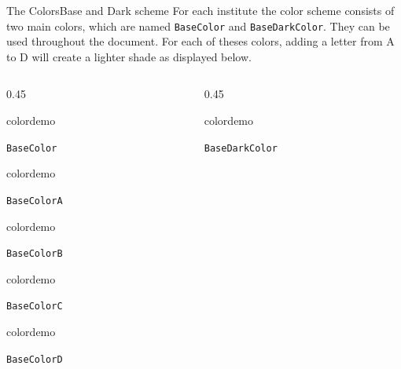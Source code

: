 \documentclass[final]{beamer}
\begin{document}
\begin{frame}{The Colors}{Base and Dark scheme}
For each institute the color scheme consists of two main colors, which are named 
\texttt{BaseColor} and \texttt{BaseDarkColor}. They can be used throughout the document. For each of theses colors, adding a letter from A to D will create a lighter shade as displayed below.
%
%
%
%
%
\newdimen\bwidth
\setlength{\bwidth}{0.35\textwidth}
\vspace{1em}%
\begin{columns}
\begin{column}{0.45\textwidth}
\begin{beamercolorbox}[dp=0pt,sep=0em,wd=\bwidth,ht=10cm]{}
%
\begin{beamercolorbox}[sep=0em,wd=2cm,ht=2cm]{colordemo}%
\end{beamercolorbox}\quad\texttt{BaseColor}\newline%
%
\begin{beamercolorbox}[sep=0em,wd=2cm,ht=2cm]{colordemo}
\end{beamercolorbox}\quad\texttt{BaseColorA}\hfill\newline%
%
\begin{beamercolorbox}[sep=0em,wd=2cm,ht=2cm]{colordemo}%
\end{beamercolorbox}\quad\texttt{BaseColorB}\hfill\newline%
%
\begin{beamercolorbox}[sep=0em,wd=2cm,ht=2cm]{colordemo}%
\end{beamercolorbox}\quad\texttt{BaseColorC}\hfill\newline%
%
\begin{beamercolorbox}[sep=0em,wd=2cm,ht=2cm]{colordemo}%
\end{beamercolorbox}\quad\texttt{BaseColorD}%
\end{beamercolorbox}%
\end{column}
%
% 
%
\begin{column}{0.45\textwidth}
\begin{beamercolorbox}[dp=0pt,sep=0em,wd=\bwidth,ht=10cm]{}
%
\begin{beamercolorbox}[sep=0em,wd=2cm,ht=2cm]{colordemo}%
\end{beamercolorbox}\quad\texttt{BaseDarkColor}\newline%

\end{beamercolorbox}
\end{column}
\end{columns}
\end{frame}
\end{document}
